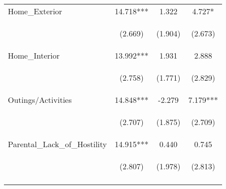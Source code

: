 \begin{tabular}{lccc}
\noalign{\smallskip}Home_Exterior & 14.718*** & 1.322 & 4.727*\\
 & \begin{footnotesize}(2.669)\end{footnotesize} & \begin{footnotesize}(1.904)\end{footnotesize} & \begin{footnotesize}(2.673)\end{footnotesize}\\
\noalign{\smallskip}Home_Interior & 13.992*** & 1.931 & 2.888\\
 & \begin{footnotesize}(2.758)\end{footnotesize} & \begin{footnotesize}(1.771)\end{footnotesize} & \begin{footnotesize}(2.829)\end{footnotesize}\\
\noalign{\smallskip}Outings/Activities & 14.848*** & -2.279 & 7.179***\\
 & \begin{footnotesize}(2.707)\end{footnotesize} & \begin{footnotesize}(1.875)\end{footnotesize} & \begin{footnotesize}(2.709)\end{footnotesize}\\
\noalign{\smallskip}Parental_Lack_of_Hostility & 14.915*** & 0.440 & 0.745\\
 & \begin{footnotesize}(2.807)\end{footnotesize} & \begin{footnotesize}(1.978)\end{footnotesize} & \begin{footnotesize}(2.813)\end{footnotesize}\\
\noalign{\smallskip}\hline\end{tabular}\\
